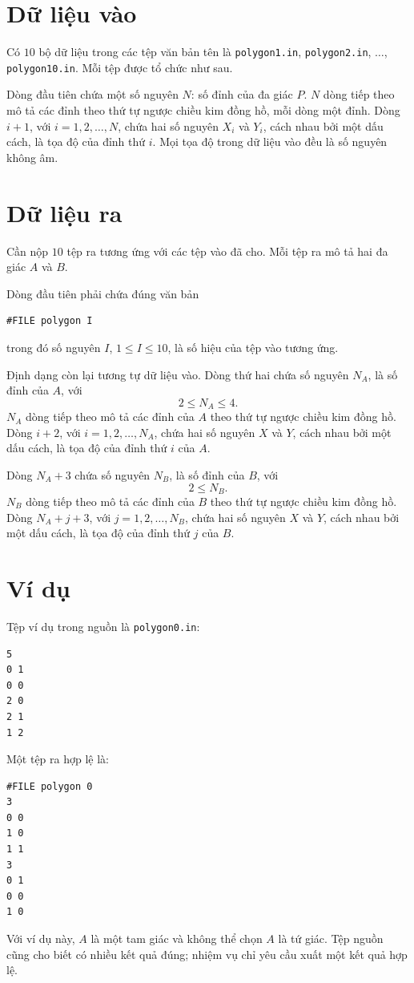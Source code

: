 \documentclass[11pt]{article}
\begin{document}
\section{Dữ liệu vào}

Có \(10\) bộ dữ liệu trong các tệp văn bản tên là
\texttt{polygon1.in}, \texttt{polygon2.in}, \(\ldots\),
\texttt{polygon10.in}. Mỗi tệp được tổ chức như sau.

Dòng đầu tiên chứa một số nguyên \(N\): số đỉnh của đa giác \(P\). \(N\) dòng
tiếp theo mô tả các đỉnh theo thứ tự ngược chiều kim đồng hồ, mỗi dòng một
đỉnh. Dòng \(i+1\), với \(i=1,2,\ldots,N\), chứa hai số nguyên \(X_i\) và
\(Y_i\), cách nhau bởi một dấu cách, là tọa độ của đỉnh thứ \(i\). Mọi tọa độ
trong dữ liệu vào đều là số nguyên không âm.

\section{Dữ liệu ra}

Cần nộp \(10\) tệp ra tương ứng với các tệp vào đã cho. Mỗi tệp ra mô tả hai
đa giác \(A\) và \(B\).

Dòng đầu tiên phải chứa đúng văn bản
\begin{verbatim}
#FILE polygon I
\end{verbatim}
trong đó số nguyên \(I\), \(1\le I\le 10\), là số hiệu của tệp vào tương ứng.

Định dạng còn lại tương tự dữ liệu vào. Dòng thứ hai chứa số nguyên
\(N_A\), là số đỉnh của \(A\), với
\[
  2\le N_A\le 4.
\]
\(N_A\) dòng tiếp theo mô tả các đỉnh của \(A\) theo thứ tự ngược chiều kim
đồng hồ. Dòng \(i+2\), với \(i=1,2,\ldots,N_A\), chứa hai số nguyên \(X\) và
\(Y\), cách nhau bởi một dấu cách, là tọa độ của đỉnh thứ \(i\) của \(A\).

Dòng \(N_A+3\) chứa số nguyên \(N_B\), là số đỉnh của \(B\), với
\[
  2\le N_B.
\]
\(N_B\) dòng tiếp theo mô tả các đỉnh của \(B\) theo thứ tự ngược chiều kim
đồng hồ. Dòng \(N_A+j+3\), với \(j=1,2,\ldots,N_B\), chứa hai số nguyên
\(X\) và \(Y\), cách nhau bởi một dấu cách, là tọa độ của đỉnh thứ \(j\) của
\(B\).

\section{Ví dụ}

Tệp ví dụ trong nguồn là \texttt{polygon0.in}:
\begin{verbatim}
5
0 1
0 0
2 0
2 1
1 2
\end{verbatim}

Một tệp ra hợp lệ là:
\begin{verbatim}
#FILE polygon 0
3
0 0
1 0
1 1
3
0 1
0 0
1 0
\end{verbatim}

Với ví dụ này, \(A\) là một tam giác và không thể chọn \(A\) là tứ giác. Tệp
nguồn cũng cho biết có nhiều kết quả đúng; nhiệm vụ chỉ yêu cầu xuất một kết
quả hợp lệ.
\end{document}
